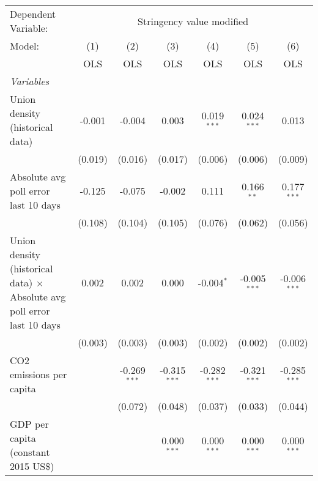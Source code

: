 
\begingroup
\centering
\begin{tabular}{lcccccc}
   \toprule
   Dependent Variable: & \multicolumn{6}{c}{Stringency value modified}\\
   Model:                                                                         & (1)     & (2)            & (3)            & (4)            & (5)            & (6)\\  
                                                                                  &  OLS    & OLS            & OLS            & OLS            & OLS            & OLS\\  
   \midrule
   \emph{Variables}\\
   Union density (historical data)                                                & -0.001  & -0.004         & 0.003          & 0.019$^{***}$  & 0.024$^{***}$  & 0.013\\   
                                                                                  & (0.019) & (0.016)        & (0.017)        & (0.006)        & (0.006)        & (0.009)\\   
   Absolute avg poll error last 10 days                                           & -0.125  & -0.075         & -0.002         & 0.111          & 0.166$^{**}$   & 0.177$^{***}$\\   
                                                                                  & (0.108) & (0.104)        & (0.105)        & (0.076)        & (0.062)        & (0.056)\\   
   Union density (historical data) $\times$ Absolute avg poll error last 10 days  & 0.002   & 0.002          & 0.000          & -0.004$^{*}$   & -0.005$^{***}$ & -0.006$^{***}$\\   
                                                                                  & (0.003) & (0.003)        & (0.003)        & (0.002)        & (0.002)        & (0.002)\\   
   CO2 emissions per capita                                                       &         & -0.269$^{***}$ & -0.315$^{***}$ & -0.282$^{***}$ & -0.321$^{***}$ & -0.285$^{***}$\\   
                                                                                  &         & (0.072)        & (0.048)        & (0.037)        & (0.033)        & (0.044)\\   
   GDP per capita (constant 2015 US\$)                                            &         &                & 0.000$^{***}$  & 0.000$^{***}$  & 0.000$^{***}$  & 0.000$^{***}$\\   

\end{tabular}

